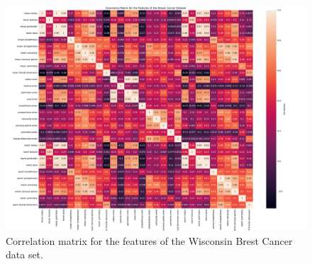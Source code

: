 \documentclass[aps,reprint,superscriptaddress,nofootinbib]{revtex4-2}
\begin{document}
\clearpage

\onecolumngrid
\begin{figure}[htp]
    \centering
    \includegraphics[scale=0.325]{corr_cancer.pdf}
    \caption{Correlation matrix for the features of the Wisconsin Brest Cancer data set.}
    \label{fig:cov_cancer}
\end{figure}

\clearpage


\end{document}
